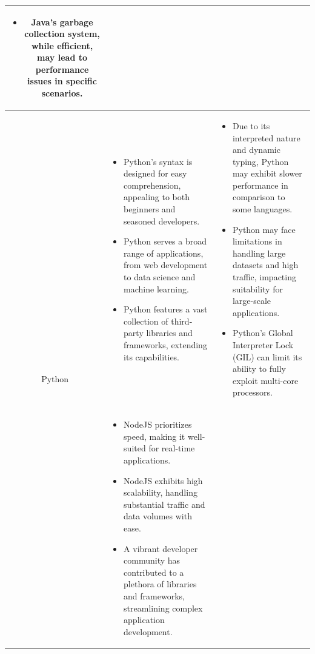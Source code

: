 \begin{table}[H]
\begin{tabular}{| c | p{} | p{} |}
\begin{itemize}[leftmargin=*,topsep=0pt,partopsep=0pt,parsep=0pt]
                        \item Java's garbage collection system, while efficient, may lead to performance issues in specific scenarios.
                    \end{itemize} \\ \hline
        \multirow{8}{*}{Python}
                &   \begin{itemize}[leftmargin=*,topsep=0pt,partopsep=0pt,parsep=0pt]
                        \item Python's syntax is designed for easy comprehension, appealing to both beginners and seasoned developers.
                        \item Python serves a broad range of applications, from web development to data science and machine learning.
                        \item Python features a vast collection of third-party libraries and frameworks, extending its capabilities.
                    \end{itemize}
                &   \begin{itemize}[leftmargin=*,topsep=0pt,partopsep=0pt,parsep=0pt]
                        \item Due to its interpreted nature and dynamic typing, Python may exhibit slower performance in comparison to some languages.
                        \item Python may face limitations in handling large datasets and high traffic, impacting suitability for large-scale applications.
                        \item Python's Global Interpreter Lock (GIL) can limit its ability to fully exploit multi-core processors.
                    \end{itemize} \\ \hline
        \multirow{8}{*}{NodeJS}
                    &   \begin{itemize}[leftmargin=*,topsep=0pt,partopsep=0pt,parsep=0pt]
                            \item NodeJS prioritizes speed, making it well-suited for real-time applications.
                            \item NodeJS exhibits high scalability, handling substantial traffic and data volumes with ease.
                            \item A vibrant developer community has contributed to a plethora of libraries and frameworks, streamlining complex application development.
                        \end{itemize}

\end{tabular}
\end{table}
